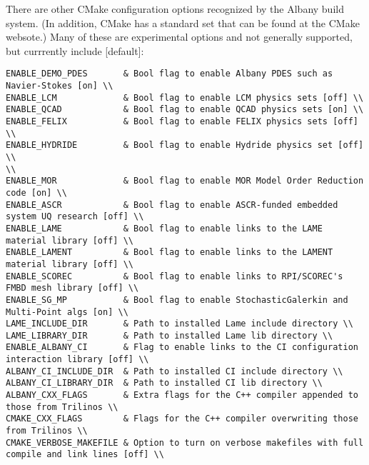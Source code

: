 \documentclass[pdf,12pt,report,strict]{SANDreport}
\theoremstyle{remark}
\begin{document}
There are other CMake configuration options recognized by the
Albany build system. (In addition, CMake has a standard set that
can be found at the CMake websote.) Many of these are experimental
options and not generally supported, but currrently include [default]:
\begin{verbatim}
ENABLE_DEMO_PDES       & Bool flag to enable Albany PDES such as Navier-Stokes [on] \\
ENABLE_LCM             & Bool flag to enable LCM physics sets [off] \\
ENABLE_QCAD            & Bool flag to enable QCAD physics sets [on] \\
ENABLE_FELIX           & Bool flag to enable FELIX physics sets [off] \\
ENABLE_HYDRIDE         & Bool flag to enable Hydride physics set [off] \\
\\
ENABLE_MOR             & Bool flag to enable MOR Model Order Reduction code [on] \\
ENABLE_ASCR            & Bool flag to enable ASCR-funded embedded system UQ research [off] \\
ENABLE_LAME            & Bool flag to enable links to the LAME material library [off] \\
ENABLE_LAMENT          & Bool flag to enable links to the LAMENT material library [off] \\
ENABLE_SCOREC          & Bool flag to enable links to RPI/SCOREC's FMBD mesh library [off] \\
ENABLE_SG_MP           & Bool flag to enable StochasticGalerkin and Multi-Point algs [on] \\
LAME_INCLUDE_DIR       & Path to installed Lame include directory \\
LAME_LIBRARY_DIR       & Path to installed Lame lib directory \\
ENABLE_ALBANY_CI       & Flag to enable links to the CI configuration interaction library [off] \\
ALBANY_CI_INCLUDE_DIR  & Path to installed CI include directory \\
ALBANY_CI_LIBRARY_DIR  & Path to installed CI lib directory \\
ALBANY_CXX_FLAGS       & Extra flags for the C++ compiler appended to those from Trilinos \\
CMAKE_CXX_FLAGS        & Flags for the C++ compiler overwriting those from Trilinos \\
CMAKE_VERBOSE_MAKEFILE & Option to turn on verbose makefiles with full compile and link lines [off] \\
\end{verbatim}
\end{document}
